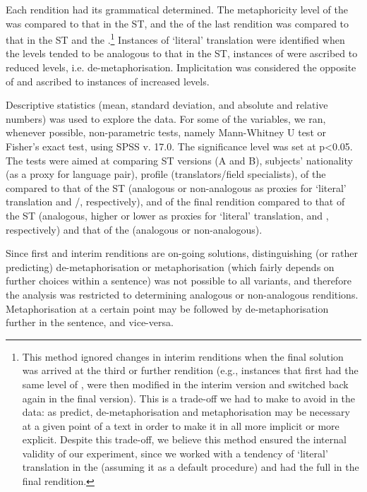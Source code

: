 \documentclass[output=paper]{LSP/langsci}
\begin{document}
  
Each rendition had its grammatical  determined. The met\-a\-phor\-icity level of the  was compared to that in the ST, and the  of the last rendition was compared to that in the ST and the .\footnote{This method ignored changes in interim renditions when the final solution was arrived at the third or further rendition (e.g., instances that first had the same level of , were then modified in the interim version and switched back again in the final version). This is a trade-off we had to make to avoid  in the data: as \citet{Halliday1999, Steiner2001Intralingual, Steiner2001Translations} predict, de-meta\-phor\-i\-sa\-tion and metaphorisation may be necessary at a given point of a text in order to make it in all more implicit or more explicit. Despite this trade-off, we believe this method ensured the internal validity of our experiment, since we worked with a tendency of `literal' translation in the  (assuming it as a default procedure) and had the full  in the final rendition.} Instances of `literal' translation were identified when the  levels tended to be analogous to that in the ST, instances of  were ascribed to reduced  levels, i.e. de-meta\-phor\-i\-sa\-tion. Implicitation was considered the opposite of  and ascribed to instances of increased  levels. 

  
Descriptive statistics (mean, standard deviation, and absolute and relative numbers) was used to explore the data. For some of the variables, we ran, whenever possible, non-parametric tests, namely Mann-Whitney U test or Fisher's exact test, using SPSS v. 17.0. The significance level was set at p<0.05. The tests were aimed at comparing ST versions (A and B), subjects' nationality (as a proxy for language pair), profile (translators/field specialists),  of the  compared to that of the ST (analogous or non-analogous as proxies for `literal' translation and /, respectively), and  of the final rendition compared to that of the ST (analogous, higher or lower as proxies for `literal' translation,  and , respectively) and that of the  (analogous or non-analogous). 

  
Since first and interim renditions are on-going solutions, distinguishing (or rather predicting) de-meta\-phor\-i\-sa\-tion or metaphorisation (which fairly depends on further choices within a sentence) was not possible to all variants, and therefore the analysis was restricted to determining analogous or non-analogous renditions. Metaphorisation at a certain point may be followed by de-meta\-phor\-i\-sa\-tion further in the sentence, and vice-versa. 
\end{document}
